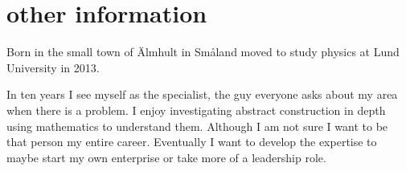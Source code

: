 \documentclass[]{twentysecondcv}
\begin{document}
\section{other information}
Born in the small town of \"Almhult in Sm\aa land moved to study
physics at Lund University in 2013.

In ten years I see myself as the specialist, the guy everyone asks
about my area when there is a problem. I enjoy investigating abstract
construction in depth using mathematics to understand them. Although I
am not sure I want to be that person my entire career. Eventually I
want to develop the expertise to maybe start my own enterprise or take
more of a leadership role.

\end{document}
